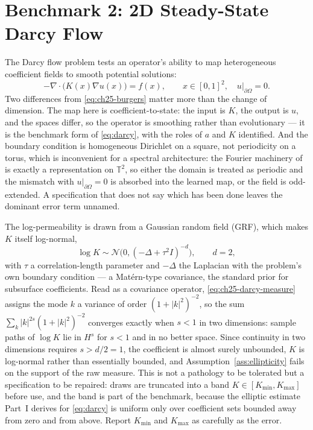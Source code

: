 \section{Benchmark 2: 2D Steady-State Darcy Flow}
\label{sec:ch25-darcy}

The Darcy flow problem tests an operator's ability to map heterogeneous
coefficient fields to smooth potential solutions:
\begin{equation}
  \label{eq:ch25-darcy}
  -\nabla \cdot \big( K(x) \nabla u(x) \big) = f(x), \qquad x \in [0, 1]^2, \quad u|_{\partial\Omega} = 0.
\end{equation}
Two differences from \eqref{eq:ch25-burgers} matter more than the change of
dimension. The map here is coefficient-to-state: the input is $K$, the output is
$u$, and the spaces differ, so the operator is smoothing rather than
evolutionary --- it is the benchmark form of \eqref{eq:darcy}, with the roles of
$a$ and $K$ identified. And the boundary condition is homogeneous Dirichlet on a
square, not periodicity on a torus, which is inconvenient for a spectral
architecture: the Fourier machinery of
 is exactly a
representation on $\mathbb{T}^2$, so either the domain is treated as periodic and
the mismatch with $u|_{\partial\Omega} = 0$ is absorbed into the learned map, or
the field is odd-extended. A specification that does not say which has been done
leaves the dominant error term unnamed.

The log-permeability is drawn from a Gaussian random field (GRF), which makes $K$
itself log-normal,
\begin{equation}
  \label{eq:ch25-darcy-measure}
  \log K \sim \mathcal{N}\big(0, (-\Delta + \tau^{2} I)^{-d}\big), \qquad d = 2,
\end{equation}
with $\tau$ a correlation-length parameter and $-\Delta$ the Laplacian with the
problem's own boundary condition \cite{stuart2010inverse} --- a Mat\'ern-type
covariance, the standard prior for subsurface coefficients. Read as a covariance
operator, \eqref{eq:ch25-darcy-measure} assigns the mode $k$ a variance of order
$(1 + |k|^{2})^{-2}$, so the sum $\sum_{k} |k|^{2s}(1+|k|^{2})^{-2}$ converges
exactly when $s < 1$ in two dimensions: sample paths of $\log K$ lie in
$H^{s}$ for $s < 1$ and in no better space. Since continuity in two dimensions
requires $s > d/2 = 1$, the coefficient is almost surely unbounded, $K$ is
log-normal rather than essentially bounded, and Assumption~\ref{ass:ellipticity}
fails on the support of the raw measure. This is not a pathology to be tolerated
but a specification to be repaired: draws are truncated into a band
$K \in [K_{\min}, K_{\max}]$ before use, and the band is part of the benchmark,
because the elliptic estimate Part~I derives for \eqref{eq:darcy} is uniform only
over coefficient sets bounded away from zero and from above. Report $K_{\min}$ and
$K_{\max}$ as carefully as the error.

